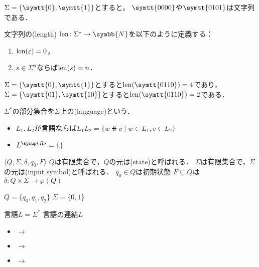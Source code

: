 \documentclass[../main.tex]{subfiles}
\begin{document}
\begin{exa} \(\Sigma = \{\symtt{0}, \symtt{1}\}\)とすると，
\(\symtt{0000}\)や\(\symtt{0101}\)は文字列である．
\end{exa}

\begin{thmbox}
\begin{definition}
文字列の(length) \(\len\colon \Sigma^{\mathord{*}} \to \symbb{N}\)を以下のように定義する：
\begin{enumerate}
    \item \(\operatorname{len} (\varepsilon) = 0\)，
    \item \(s \in \Sigma^n\)ならば\(\operatorname{len} (s) = n\)．
\end{enumerate}
\end{definition}
\end{thmbox}

\begin{exa} \(\Sigma = \{\symtt{0}, \symtt{1}\}\)とすると\(\len(\symtt{0110}) = 4\)であり，
\(\Sigma = \{\symtt{01}, \symtt{10}\}\)とすると\(\len(\symtt{0110}) = 2\)である．
\end{exa}


\begin{definition} \(\Sigma^{\mathord{*}}\)の部分集合を\(\Sigma\)上の(language)という．
\begin{itemize}
    \item \(L_1, L_2\)が言語ならば\(L_1L_2 = \{ w \doubleplus v \mid w \in L_1, v \in L_2 \}\)
    \item \(L^{\symup{R}} = \{ \}\)
\end{itemize}
\end{definition}


\begin{definition}
\(\langle Q, \Sigma, \delta, q_0, F \rangle\)
\(Q\)は有限集合で，\(Q\)の元は(state)と呼ばれる．
\(\Sigma\)は有限集合で，\(\Sigma\)の元は(input symbol)と呼ばれる．
\(q_0 \in Q\)は初期状態
\(F \subseteq Q\)は
\(\delta\colon Q \times \Sigma \to \wp(Q)\)
\end{definition}

\(Q = \{q_0, q_1, q_2\}\)
\(\Sigma = \{0, 1\}\)

\begin{definition}
言語\(L = \Sigma^{\mathord{*}}\)
言語の連結\(L\)
\end{definition}

\begin{itemize}
    \item {} \(\to\)  
    \item {} \(\to\) 
    \item {} \(\to\) 
\end{itemize}
\end{document}
